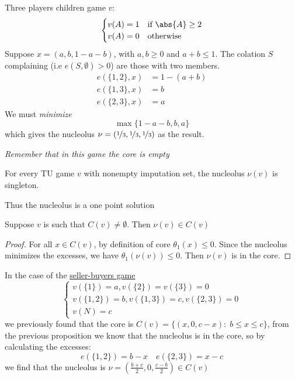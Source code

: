 \documentclass[../main.tex]{subfiles}
\begin{document}
\begin{example}
    Three players children game $v$:
    \[
        \begin{cases}
            v(A) = 1 & \text{if } \abs{A} \geq 2 \\
            v(A) = 0 & \text{otherwise}
        \end{cases}
    \]
    Suppose $x = (a,b,1-a-b)$, with $a,b \geq 0$ and $a+b \leq 1$. The colation $S$ complaining (i.e $e(S, \emptyset) > 0$) are those with two members.
    \begin{align*}
        e(\{1,2\},x) & = 1 - (a + b) \\
        e(\{1,3\},x) & = b           \\
        e(\{2,3\},x) & = a
    \end{align*}
    We must \textit{minimize}
    \[
        \max \{1-a-b, b, a\}
    \]
    which gives the nucleolus $\nu = (\nicefrac{1}{3}, \nicefrac{1}{3}, \nicefrac{1}{3})$ as the result.

    \textit{Remember that in this game the core is empty}
\end{example}
\begin{theorem}
    For every \gls{TU} game $v$ with nonempty imputation set, the nucleolus $\nu(v)$ is singleton.
\end{theorem}
Thus the nucleolus is a one point solution
\begin{proposition}
    Suppose $v$ is such that $C(v) \neq \emptyset$. Then $\nu(v) \in C(v)$
\end{proposition}
\begin{proof}
    For all $x \in C(v)$, by definition of core $\theta_1(x) \leq 0$. Since the nucleolus minimizes the excesses, we have $\theta_1(\nu(v)) \leq 0$. Then $\nu(v)$ is in the core.
\end{proof}
\begin{example}
    In the case of the \hyperref[ex:seller-buyers-core]{seller-buyers game}
    \[
        \begin{cases}
            v(\{1\}) = a, v(\{2\}) = v(\{3\}) = 0          \\
            v(\{1,2\}) = b, v(\{1,3\}) = c, v(\{2,3\}) = 0 \\
            v(N) = c
        \end{cases}
    \]
    we previously found that the core is $C(v) = \{(x, 0, c-x) : \; b \leq x \leq c\}$, from the previous proposition we know that the nucleolus is in the core, so by calculating the excesses:
    \[
        e(\{1,2\}) = b-x \quad e(\{2,3\}) = x-c
    \]
    we find that the nucleolus is $\nu = (\frac{b+c}{2}, 0, \frac{c-b}{2}) \in C(v)$
\end{example}
\end{document}

